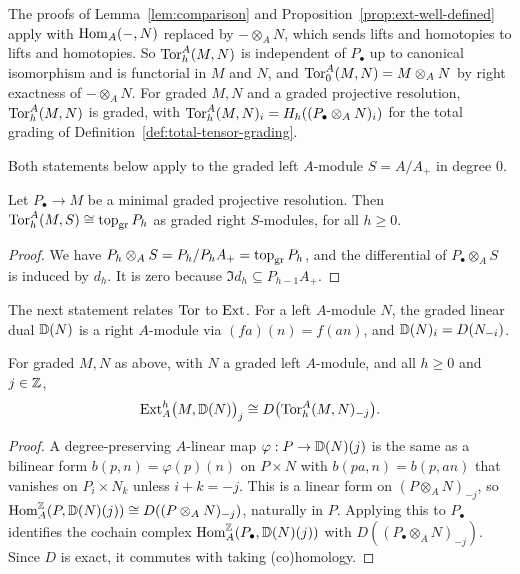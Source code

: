 The proofs of Lemma~\ref{lem:comparison} and Proposition~\ref{prop:ext-well-defined} apply with $\operatorname{Hom}\nolimits_A(-,N)$ replaced by $-\otimes_AN$, which sends lifts and homotopies to lifts and homotopies.
So $\operatorname{Tor}\nolimits_h^A(M,N)$ is independent of $P_\bullet$ up to canonical isomorphism and is functorial in $M$ and $N$, and $\operatorname{Tor}\nolimits_0^A(M,N)=M\otimes_AN$ by right exactness of $-\otimes_AN$.
For graded $M,N$ and a graded projective resolution, $\operatorname{Tor}\nolimits_h^A(M,N)$ is graded, with $\operatorname{Tor}\nolimits_h^A(M,N)_i=H_h((P_\bullet\otimes_AN)_i)$ for the total grading of Definition~\ref{def:total-tensor-grading}.

Both statements below apply to the graded left $A$-module $S=A/A_+$ in degree $0$.

\begin{proposition}\label{prop:tor-top}
Let $P_\bullet\to M$ be a minimal graded projective resolution.
Then $\operatorname{Tor}\nolimits_h^A(M,S)\cong\operatorname{top}\nolimits_{\mathrm{gr}} P_h$ as graded right $S$-modules, for all $h\geq0$.
\end{proposition}

\begin{proof}
We have $P_h\otimes_AS=P_h/P_hA_+=\operatorname{top}\nolimits_{\mathrm{gr}} P_h$, and the differential of $P_\bullet\otimes_AS$ is induced by $d_h$.
It is zero because $\Im d_h\subseteq P_{h-1}A_+$.
\end{proof}

The next statement relates $\operatorname{Tor}\nolimits$ to $\operatorname{Ext}\nolimits$.
For a left $A$-module $N$, the graded linear dual $\mathbb{D}(N)$ is a right $A$-module via $(fa)(n)=f(an)$, and $\mathbb{D}(N)_i=D(N_{-i})$.

\begin{proposition}\label{prop:ext-tor-duality}
For graded $M,N$ as above, with $N$ a graded left $A$-module, and all $h\geq0$ and $j\in\mathbb{Z}$,
\[
\operatorname{Ext}\nolimits_A^h\bigl(M,\mathbb{D}(N)\bigr)_j\cong D\bigl(\operatorname{Tor}\nolimits_h^A(M,N)_{-j}\bigr).
\]
\end{proposition}

\begin{proof}
A degree-preserving $A$-linear map $\varphi:P\to\mathbb{D}(N)(j)$ is the same as a bilinear form $b(p,n)=\varphi(p)(n)$ on $P\times N$ with $b(pa,n)=b(p,an)$ that vanishes on $P_i\times N_k$ unless $i+k=-j$.
This is a linear form on $(P\otimes_AN)_{-j}$, so $\operatorname{Hom}\nolimits_A^{\mathbb{Z}}(P,\mathbb{D}(N)(j))\cong D((P\otimes_AN)_{-j})$, naturally in $P$.
Applying this to $P_\bullet$ identifies the cochain complex $\operatorname{Hom}\nolimits_A^{\mathbb{Z}}(P_\bullet,\mathbb{D}(N)(j))$ with $D((P_\bullet\otimes_AN)_{-j})$.
Since $D$ is exact, it commutes with taking (co)homology.
\end{proof}

